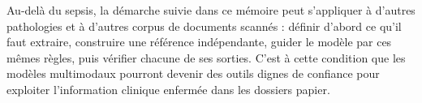 Au-delà du sepsis, la démarche suivie dans ce mémoire peut s'appliquer à d'autres pathologies et à d'autres corpus de documents scannés : définir d'abord ce qu'il faut extraire, construire une référence indépendante, guider le modèle par ces mêmes règles, puis vérifier chacune de ses sorties. C'est à cette condition que les modèles multimodaux pourront devenir des outils dignes de confiance pour exploiter l'information clinique enfermée dans les dossiers papier.
